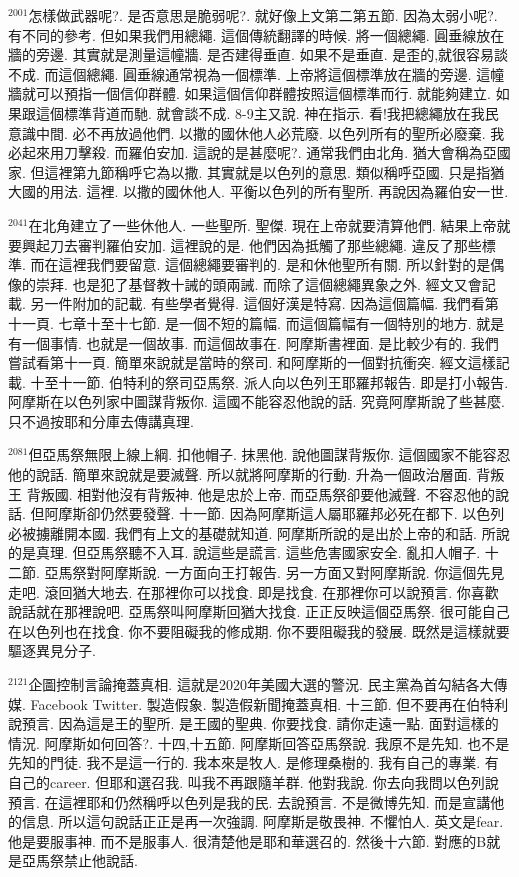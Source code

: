 \documentclass{book}
\begin{document}
$^{2001}$怎樣做武器呢?.
是否意思是脆弱呢?.
就好像上文第二第五節.
因為太弱小呢?.
有不同的參考.
但如果我們用總繩.
這個傳統翻譯的時候.
將一個總繩.
圓垂線放在牆的旁邊.
其實就是測量這幢牆.
是否建得垂直.
如果不是垂直.
是歪的,就很容易談不成.
而這個總繩.
圓垂線通常視為一個標準.
上帝將這個標準放在牆的旁邊.
這幢牆就可以預指一個信仰群體.
如果這個信仰群體按照這個標準而行.
就能夠建立.
如果跟這個標準背道而馳.
就會談不成.
8-9主又說.
神在指示.
看!我把總繩放在我民意識中間.
必不再放過他們.
以撒的國休他人必荒廢.
以色列所有的聖所必廢棄.
我必起來用刀擊殺.
而羅伯安加.
這說的是甚麼呢?.
通常我們由北角.
猶大會稱為亞國家.
但這裡第九節稱呼它為以撒.
其實就是以色列的意思.
類似稱呼亞國.
只是指猶大國的用法.
這裡.
以撒的國休他人.
平衡以色列的所有聖所.
再說因為羅伯安一世.

$^{2041}$在北角建立了一些休他人.
一些聖所.
聖傑.
現在上帝就要清算他們.
結果上帝就要興起刀去審判羅伯安加.
這裡說的是.
他們因為抵觸了那些總繩.
違反了那些標準.
而在這裡我們要留意.
這個總繩要審判的.
是和休他聖所有關.
所以針對的是偶像的崇拜.
也是犯了基督教十誡的頭兩誡.
而除了這個總繩異象之外.
經文又會記載.
另一件附加的記載.
有些學者覺得.
這個好漢是特寫.
因為這個篇幅.
我們看第十一頁.
七章十至十七節.
是一個不短的篇幅.
而這個篇幅有一個特別的地方.
就是有一個事情.
也就是一個故事.
而這個故事在.
阿摩斯書裡面.
是比較少有的.
我們嘗試看第十一頁.
簡單來說就是當時的祭司.
和阿摩斯的一個對抗衝突.
經文這樣記載.
十至十一節.
伯特利的祭司亞馬祭.
派人向以色列王耶羅邦報告.
即是打小報告.
阿摩斯在以色列家中圖謀背叛你.
這國不能容忍他說的話.
究竟阿摩斯說了些甚麼.
只不過按耶和分庫去傳講真理.

$^{2081}$但亞馬祭無限上線上綱.
扣他帽子.
抹黑他.
說他圖謀背叛你.
這個國家不能容忍他的說話.
簡單來說就是要滅聲.
所以就將阿摩斯的行動.
升為一個政治層面.
背叛王 背叛國.
相對他沒有背叛神.
他是忠於上帝.
而亞馬祭卻要他滅聲.
不容忍他的說話.
但阿摩斯卻仍然要發聲.
十一節.
因為阿摩斯這人屬耶羅邦必死在都下.
以色列必被擄離開本國.
我們有上文的基礎就知道.
阿摩斯所說的是出於上帝的和話.
所說的是真理.
但亞馬祭聽不入耳.
說這些是謊言.
這些危害國家安全.
亂扣人帽子.
十二節.
亞馬祭對阿摩斯說.
一方面向王打報告.
另一方面又對阿摩斯說.
你這個先見走吧.
滾回猶大地去.
在那裡你可以找食.
即是找食.
在那裡你可以說預言.
你喜歡說話就在那裡說吧.
亞馬祭叫阿摩斯回猶大找食.
正正反映這個亞馬祭.
很可能自己在以色列也在找食.
你不要阻礙我的修成期.
你不要阻礙我的發展.
既然是這樣就要驅逐異見分子.

$^{2121}$企圖控制言論掩蓋真相.
這就是2020年美國大選的警況.
民主黨為首勾結各大傳媒.
Facebook Twitter.
製造假象.
製造假新聞掩蓋真相.
十三節.
但不要再在伯特利說預言.
因為這是王的聖所.
是王國的聖典.
你要找食.
請你走遠一點.
面對這樣的情況.
阿摩斯如何回答?.
十四,十五節.
阿摩斯回答亞馬祭說.
我原不是先知.
也不是先知的門徒.
我不是這一行的.
我本來是牧人.
是修理桑樹的.
我有自己的專業.
有自己的career.
但耶和選召我.
叫我不再跟隨羊群.
他對我說.
你去向我問以色列說預言.
在這裡耶和仍然稱呼以色列是我的民.
去說預言.
不是微博先知.
而是宣講他的信息.
所以這句說話正正是再一次強調.
阿摩斯是敬畏神.
不懼怕人.
英文是fear.
他是要服事神.
而不是服事人.
很清楚他是耶和華選召的.
然後十六節.
對應的B就是亞馬祭禁止他說話.
\end{document}
